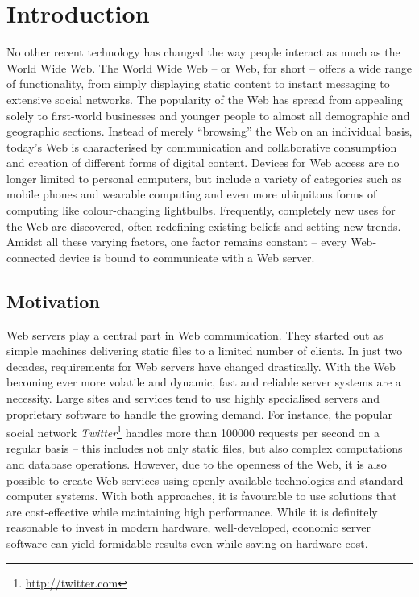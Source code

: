 \chapter{Introduction}
No other recent technology has changed the way people interact as much as the World Wide Web. The World Wide Web -- or Web, for short -- offers a wide range of functionality, from simply displaying static content to instant messaging to extensive social networks. The popularity of the Web has spread from appealing solely to first-world businesses and younger people to almost all demographic and geographic sections. Instead of merely ``browsing'' the Web on an individual basis, today's Web is characterised by communication and collaborative consumption and creation of different forms of digital content. Devices for Web access are no longer limited to personal computers, but include a variety of categories such as mobile phones and wearable computing and even more ubiquitous forms of computing like colour-changing lightbulbs. Frequently, completely new uses for the Web are discovered, often redefining existing beliefs and setting new trends. Amidst all these varying factors, one factor remains constant -- every Web-connected device is bound to communicate with a Web server.

\section{Motivation}
Web servers play a central part in Web communication. They started out as simple machines delivering static files to a limited number of clients. In just two decades, requirements for Web servers have changed drastically. With the Web becoming ever more volatile and dynamic, fast and reliable server systems are a necessity. Large sites and services tend to use highly specialised servers and proprietary software to handle the growing demand. For instance, the popular social network \textit{Twitter}\footnote{\url{http://twitter.com}} handles more than 100000 requests per second on a regular basis -- this includes not only static files, but also complex computations and database operations. However, due to the openness of the Web, it is also possible to create Web services using openly available technologies and standard computer systems. With both approaches, it is favourable to use solutions that are cost-effective while maintaining high performance. While it is definitely reasonable to invest in modern hardware, well-developed, economic server software can yield formidable results even while saving on hardware cost.

